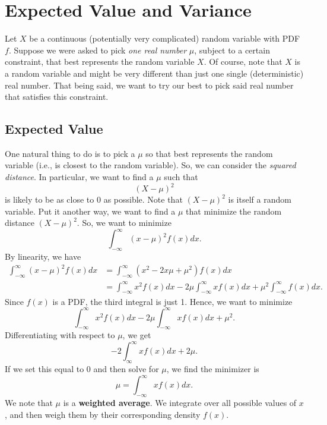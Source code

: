 \documentclass[letterpaper]{article}
\begin{document}
\section{Expected Value and Variance}
Let $X$ be a continuous (potentially very complicated) random variable with PDF $f$. Suppose we were asked to pick \emph{one real number} $\mu$, subject to a certain constraint, that best represents the random variable $X$. Of course, note that $X$ is a random variable and might be very different than just one single (deterministic) real number. That being said, we want to try our best to pick said real number that satisfies this constraint.

\subsection{Expected Value}
One natural thing to do is to pick a $\mu$ so that best represents the random variable (i.e., is closest to the random variable). So, we can consider the \emph{squared distance}. In particular, we want to find a $\mu$ such that \[(X - \mu)^2\] is likely to be as close to 0 as possible. Note that $(X - \mu)^2$ is itself a random variable. Put it another way, we want to find a $\mu$ that minimize the random distance $(X - \mu)^2$. So, we want to minimize 
\[\int_{-\infty}^{\infty} (x - \mu)^2 f(x) dx.\]
By linearity, we have 
\begin{equation*}
    \begin{aligned}
        \int_{-\infty}^{\infty} (x - \mu)^2 f(x) dx &= \int_{-\infty}^{\infty} (x^2 - 2x\mu + \mu^2) f(x) dx \\ 
            &= \int_{-\infty}^{\infty} x^2 f(x) dx - 2\mu \int_{-\infty}^{\infty} xf(x) dx + \mu^2 \int_{-\infty}^{\infty} f(x) dx. 
    \end{aligned}
\end{equation*} 
Since $f(x)$ is a PDF, the third integral is just 1. Hence, we want to minimize 
\[\int_{-\infty}^{\infty} x^2 f(x) dx - 2\mu \int_{-\infty}^{\infty} xf(x) dx + \mu^2.\]
Differentiating with respect to $\mu$, we get 
\[-2 \int_{\infty}^{\infty} xf(x) dx + 2\mu.\]
If we set this equal to 0 and then solve for $\mu$, we find the minimizer is 
\[\mu = \int_{-\infty}^{\infty} xf(x) dx.\]
We note that $\mu$ is a \textbf{weighted average}. We integrate over all possible values of $x$, and then weigh them by their corresponding density $f(x)$. 
\end{document}
